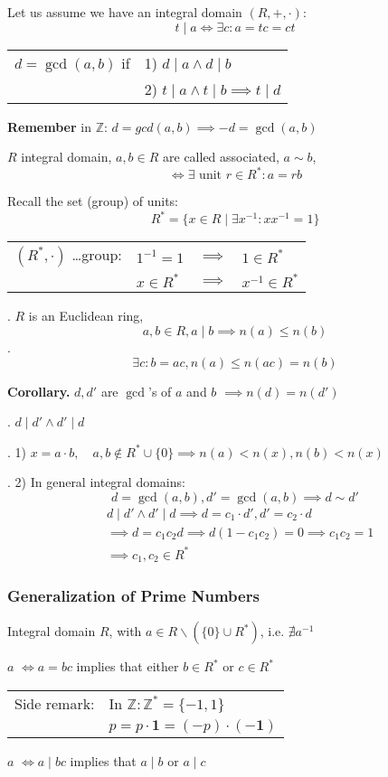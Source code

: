 Let us assume we have an integral domain $(R,+, \cdot)$:\\
\[ t∣a \Leftrightarrow \exists c: a=tc =ct \]
\begin{center}
\begin{tabular}{ll}
$d=\gcd(a,b)$ if & 1) $d∣a \land d∣b$ \\
  & 2) $t∣a \land t∣b \implies t∣d$
\end{tabular}
\end{center}

\textbf{Remember}
in $\mathbb{Z}$: $d = gcd(a,b) \implies -d = \gcd(a,b)$

\begin{definition}
$R$ integral domain,
$a,b \in R$ are called associated, $a \sim b$,
\[
  \Leftrightarrow \exists \text{ unit } r \in R^{*}: a = rb
\]
\end{definition}

Recall the set (group) of units:
\[
  R^{*} = \{ x \in R \mid \exists x^{-1} : xx^{-1} = 1\}
\]
\begin{tabular}{llll}
  $(R^{*}, \cdot)$ \ldots group:
    & $1^{-1} = 1 $ & $\implies$ & $1 \in R^{*}$ \\
    & $x\in R^{*} $ & $\implies$ & $x^{-1} \in R^{*}$
\end{tabular}

\Theorem.
$R$ is an Euclidean ring, \[ a,b\in R, a∣b \implies n(a) \leq n(b) \]
\Proof.
\[
  \exists c : b = ac, n(a) \leq n(ac) = n(b)
\]

\textbf{Corollary.}
$d, d'$ are $\gcd$'s of $a$ and $b$ $\implies n(d) = n(d')$

\Proof.
$d∣d' \land d'∣d$


\Remark.
1) $x = a\cdot b, \quad a,b\not\in R^{*} \cup \{0\} \implies n(a) < n(x), n(b) < n(x)$

\Remark.
2) In general integral domains:
\[
  d= \gcd(a,b), d' = \gcd(a,b) \implies d \sim d'
\]
\begin{align*}
  &d∣d' \land d'∣d \implies d = c_1\cdot d', d' = c_2 \cdot d \\
  &\implies d = c_1c_2 d \implies d (1-c_1c_2) = 0 \implies c_1 c_2 = 1\\
  &\implies c_1,c_2 \in R^{*}
\end{align*}

\subsubsection{Generalization of Prime Numbers}
\begin{definition}
  Integral domain $R$, with $a\in R \backslash (\{0\}\cup R^{*})$, i.e. $\nexists a^{-1}$

$a$  $\Leftrightarrow a = bc$ implies that either $b\in R^{*}$ or $c\in R^{*}$

\begin{tabular}{ll}
   Side remark: & In $\mathbb{Z}: \mathbb{Z}^{*} = \{-1, 1\}$\\
   & $p = p \cdot \mathbf{1} = (-p) \cdot (\mathbf{-1})$
\end{tabular}

$a$  $\Leftrightarrow a ∣ bc$ implies that $a∣b$ or $a∣c$
\end{definition}

